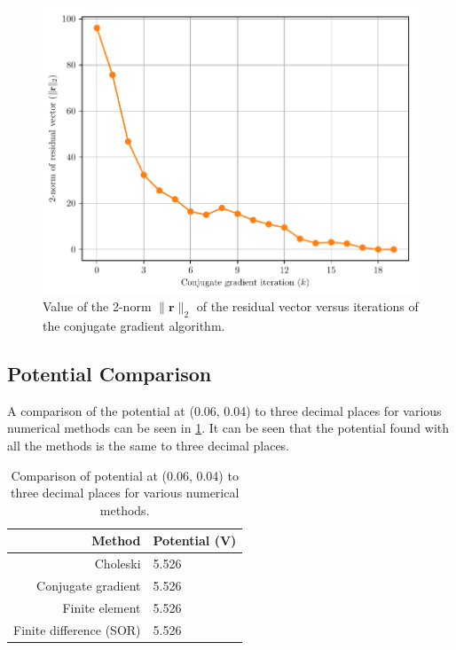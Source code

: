 \documentclass[a4paper,titlepage]{article}
\begin{document}
	\begin{figure}[!htb]
		\centering
		\includegraphics[width=\columnwidth]{plots/q3c_2.pdf}
		\caption
		{Value of the 2-norm $\|\textbf{r}\|_2$ of the residual vector versus iterations of the conjugate gradient algorithm.}
		\label{fig:q3c_2}
	\end{figure}

	\subsection{Potential Comparison}
	
	A comparison of the potential at (0.06, 0.04) to three decimal places for various numerical methods can be seen in \cref{table:potential_comparison}. It can be seen that the potential found with all the methods is the same to three decimal places.
	
	\begin{table}[!htb]
		\centering
		\caption{Comparison of potential at (0.06, 0.04) to three decimal places for various numerical methods.}
		\begin{tabular}{r | l}
			\textbf{Method} & \textbf{Potential (V)} \\ \hline
			Choleski & 5.526 \\
			Conjugate gradient & 5.526 \\
			Finite element & 5.526 \\
			Finite difference (SOR) & 5.526
		\end{tabular}
		\label{table:potential_comparison}
	\end{table}
	
\end{document}
